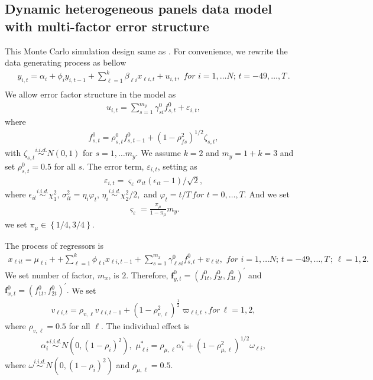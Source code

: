 \documentclass[12pt,a4paper,hyperref]{article}
\begin{document}
\subsection{Dynamic heterogeneous panels data model with multi-factor error structure}
This Monte Carlo simulation design same as \citet{Norkute:2019}. 
For convenience, we rewrite the data generating process as bellow
\begin{align}
y_{i,t}=\alpha_{i}+\phi_{i} y_{i,t-1}+ \sum^{k}_{\ell=1}\beta_{\ell i}x_{\ell i,t}+u_{i,t}, \,\, for\,\,i=1,\ldots N;\,t=-49,\ldots,T\, . \\ \label{M1}
\end{align}
We allow error factor structure in the model as
\begin{align}
u_{i,t}=    \sum^{m_{y}}_{s=1}\gamma^{0}_{si}f^{0}_{s,t} +\varepsilon_{i,t},
\end{align}
where 
\begin{align}
f^{0}_{s,t}=\rho^{0}_{s,t} f^{0}_{s,t-1}+\left( 1-\rho^{2}_{fs} \right)^{1/2}\zeta_{s,t},
\end{align}
with $\zeta_{s,t} \overset{i.i.d.}{\sim} N(0,1)$ for $s=1,\ldots m_{y}$. We assume $k=2$ and $m_{y}=1+k=3$ and set $\rho^{0}_{s,t}=0.5$ for all $s$. The error term, $\varepsilon_{i,t}$, setting as
\begin{align}
\varepsilon_{i,t}=\varsigma_{\varepsilon}\sigma_{it}\left(\epsilon_{it}-1 \right)/\sqrt{2},
\end{align}
where $ \epsilon_{it}\overset{i.i.d.}{\sim} \chi^{2}_{1},\, \sigma^{2}_{it}=\eta_{i}\varphi_{t}, \,\eta_{i}\overset{i.i.d.}{\sim}\chi^{2}_{2}/2,$  and  $\varphi_{t}=t/T\, for \,\, t=0,\ldots, T.$ And we set 
\begin{align}
\varsigma_{\varepsilon}=\frac{\pi_{\mu}}{1-\pi_{\mu}}m_{y}.
\end{align}
we set $\pi_{\mu} \in \left\{ 1/4, 3/4\right\}.$

The process of regressors is
\begin{align}
x_{\ell it}=\mu_{\ell i}++\sum^{k}_{\ell=1}\phi_{\ell i}x_{\ell i,t-1}+\sum^{m_{x}}_{s=1}\gamma^{0}_{\ell si}f^{0}_{s,t}+v_{\ell it}, \,\, for\,\,i=1,\ldots N;\,t=-49,\ldots,T\,; \, \ell=1,2.
\end{align}
We set number of factor, $m_{x}$, is $2$. Therefore, $\boldsymbol{f}^{0}_{y,t}=\left(f^{0}_{1t}, f^{0}_{2t},f^{0}_{3t}  \right)^{'}$ and $\boldsymbol{f}^{0}_{x,t}=\left(f^{0}_{1t}, f^{0}_{2t}  \right)^{'}.$
We set 
\begin{align}
v_{\ell i,t}=\rho_{v, \ell}v_{\ell i,t-1}+\left( 1-\rho^{2}_{v, \ell} \right)^{\frac{1}{2}}\varpi_{\ell i,t},  for \, \ell=1,2,
\end{align}
  where $\rho_{v, \ell}=0.5$ for all $\ell$.
The individual effect is
\begin{align}
 \alpha^{\ast}_{i}\overset{i.i.d.}{\sim} N\left(0, (1-\rho_{i})^{2} \right), \,\, \mu^{\ast}_{\ell i}=\rho_{\mu,\ell}\alpha^{\ast}_{i}+\left( 1-\rho^{2}_{\mu,\ell} \right)^{1/2}\omega_{\ell i},
\end{align}
where $\omega \overset{i.i.d.}{\sim}N\left(0, (1-\rho_{i})^{2} \right)$ and $\rho_{\mu,\ell}=0.5$.
\end{document}
